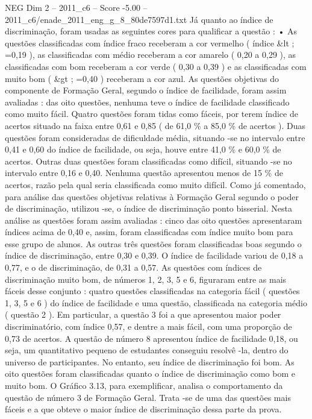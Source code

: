 \begin{textsample}{NEG Dim 2 – 2011\_c6 – Score -5.00 – 2011\_c6/enade\_2011\_eng\_g\_8\_80de7597d1.txt}
Já quanto ao índice de discriminação, foram usadas as seguintes cores para qualificar a questão : • As questões classificadas com índice fraco receberam a cor vermelho ( índice \&lt ; =0,19 ), as classificadas com médio receberam a cor amarelo ( 0,20 a 0,29 ), as classificadas com bom receberam a cor verde ( 0,30 a 0,39 ) e as classificadas com muito bom ( \&gt ; =0,40 ) receberam a cor azul.
As questões objetivas do componente de Formação Geral, segundo o índice de facilidade, foram assim avaliadas : das oito questões, nenhuma teve o índice de facilidade classificado como muito fácil.
Quatro questões foram tidas como fáceis, por terem índice de acertos situado na faixa entre 0,61 e 0,85 ( de 61,0 \% a 85,0 \% de acertos ).
Duas questões foram consideradas de dificuldade média, situando -se no intervalo entre 0,41 e 0,60 do índice de facilidade, ou seja, houve entre 41,0 \% e 60,0 \% de acertos.
Outras duas questões foram classificadas como difícil, situando -se no intervalo entre 0,16 e 0,40.
Nenhuma questão apresentou menos de 15 \% de acertos, razão pela qual seria classificada como muito difícil.
Como já comentado, para análise das questões objetivas relativas à Formação Geral segundo o poder de discriminação, utilizou -se, o índice de discriminação ponto bisserial.
Nesta análise as questões foram assim avaliadas : cinco das oito questões apresentaram índices acima de 0,40 e, assim, foram classificadas com índice muito bom para esse grupo de alunos.
As outras três questões foram classificadas boas segundo o índice de discriminação, entre 0,30 e 0,39.
O índice de facilidade variou de 0,18 a 0,77, e o de discriminação, de 0,31 a 0,57.
As questões com índices de discriminação muito bom, de números 1, 2, 3, 5 e 6, figuraram entre as mais fáceis desse conjunto : quatro questões classificadas na categoria fácil ( questões 1, 3, 5 e 6 ) do índice de facilidade e uma questão, classificada na categoria médio ( questão 2 ).
Em particular, a questão 3 foi a que apresentou maior poder discriminatório, com índice 0,57, e dentre a mais fácil, com uma proporção de 0,73 de acertos.
A questão de número 8 apresentou índice de facilidade 0,18, ou seja, um quantitativo pequeno de estudantes conseguiu resolvê -la, dentro do universo de participantes.
No entanto, seu índice de discriminação foi bom.
As oito questões foram classificadas quanto o índice de discriminação como bom e muito bom.
O Gráfico 3.13, para exemplificar, analisa o comportamento da questão de número 3 de Formação Geral.
Trata -se de uma das questões mais fáceis e a que obteve o maior índice de discriminação dessa parte da prova.

\end{textsample}
